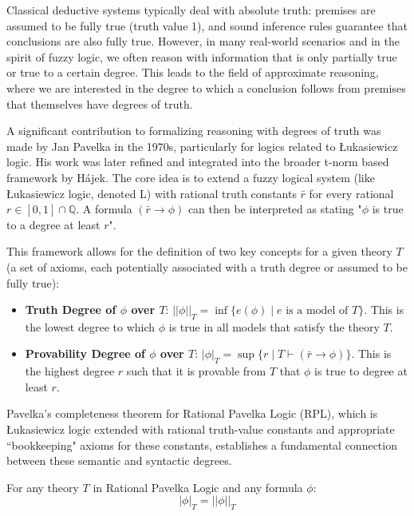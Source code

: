 Classical deductive systems typically deal with absolute truth: premises are assumed to be fully true (truth value 1), and sound inference rules guarantee that conclusions are also fully true. However, in many real-world scenarios and in the spirit of fuzzy logic, we often reason with information that is only partially true or true to a certain degree. This leads to the field of approximate reasoning, where we are interested in the degree to which a conclusion follows from premises that themselves have degrees of truth.

A significant contribution to formalizing reasoning with degrees of truth was made by Jan Pavelka in the 1970s, particularly for logics related to Łukasiewicz logic. His work was later refined and integrated into the broader t-norm based framework by Hájek. The core idea is to extend a fuzzy logical system (like Łukasiewicz logic, denoted L) with rational truth constants $\bar{r}$ for every rational $r \in [0,1] \cap \mathbb{Q}$. A formula $(\bar{r} \rightarrow \phi)$ can then be interpreted as stating "$\phi$ is true to a degree at least $r$".

This framework allows for the definition of two key concepts for a given theory $T$ (a set of axioms, each potentially associated with a truth degree or assumed to be fully true):

\begin{itemize}
    \item \textbf{Truth Degree of $\phi$ over $T$}: $||\phi||_T = \inf\{e(\phi) \mid e \text{ is a model of } T\}$. This is the lowest degree to which $\phi$ is true in all models that satisfy the theory $T$.
    \item \textbf{Provability Degree of $\phi$ over $T$}: $|\phi|_T = \sup\{r \mid T \vdash (\bar{r} \rightarrow \phi)\}$. This is the highest degree $r$ such that it is provable from $T$ that $\phi$ is true to degree at least $r$.
\end{itemize}

Pavelka's completeness theorem for Rational Pavelka Logic (RPL), which is Łukasiewicz logic extended with rational truth-value constants and appropriate ``bookkeeping" axioms for these constants, establishes a fundamental connection between these semantic and syntactic degrees.

\begin{theorem}
For any theory $T$ in Rational Pavelka Logic and any formula $\phi$:
\[
 |\phi|_T = ||\phi||_T 
\]
\end{theorem}

